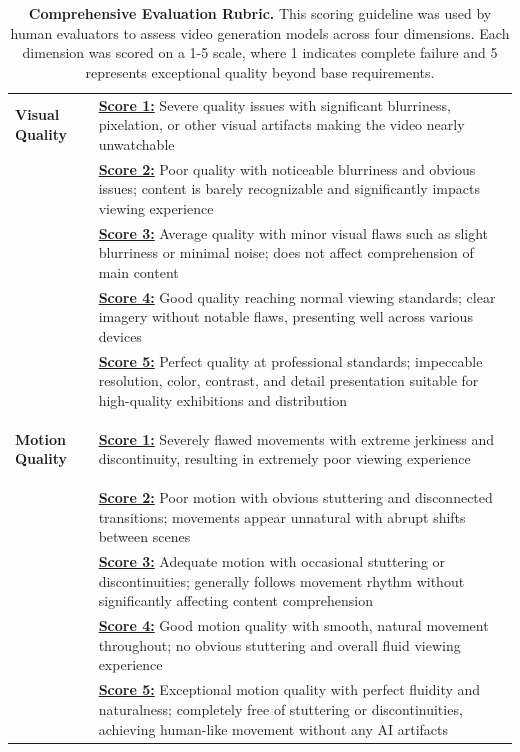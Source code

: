 \documentclass{article}
\begin{document}
\begin{table}[h]
\begin{tabular}{>{\raggedright\arraybackslash\bfseries}p{3cm}>{\raggedright\arraybackslash}p{12cm}}
\textbf{Visual Quality} & 
\textbf{\underline{Score 1:}} Severe quality issues with significant blurriness, pixelation, or other visual artifacts making the video nearly unwatchable\\[0.5ex]
& \textbf{\underline{Score 2:}} Poor quality with noticeable blurriness and obvious issues; content is barely recognizable and significantly impacts viewing experience\\[0.5ex]
& \textbf{\underline{Score 3:}} Average quality with minor visual flaws such as slight blurriness or minimal noise; does not affect comprehension of main content\\[0.5ex]
& \textbf{\underline{Score 4:}} Good quality reaching normal viewing standards; clear imagery without notable flaws, presenting well across various devices\\[0.5ex]
& \textbf{\underline{Score 5:}} Perfect quality at professional standards; impeccable resolution, color, contrast, and detail presentation suitable for high-quality exhibitions and distribution\\
\midrule

\textbf{Motion Quality} & 
\textbf{\underline{Score 1:}} Severely flawed movements with extreme jerkiness and discontinuity, resulting in extremely poor viewing experience\\[0.5ex]
& \textbf{\underline{Score 2:}} Poor motion with obvious stuttering and disconnected transitions; movements appear unnatural with abrupt shifts between scenes\\[0.5ex]
& \textbf{\underline{Score 3:}} Adequate motion with occasional stuttering or discontinuities; generally follows movement rhythm without significantly affecting content comprehension\\[0.5ex]
& \textbf{\underline{Score 4:}} Good motion quality with smooth, natural movement throughout; no obvious stuttering and overall fluid viewing experience\\[0.5ex]
& \textbf{\underline{Score 5:}} Exceptional motion quality with perfect fluidity and naturalness; completely free of stuttering or discontinuities, achieving human-like movement without any AI artifacts\\[1ex]
\bottomrule

\end{tabular}
\vspace{4pt}
\caption{\textbf{Comprehensive Evaluation Rubric.} This scoring guideline was used by human evaluators to assess video generation models across four dimensions. Each dimension was scored on a 1-5 scale, where 1 indicates complete failure and 5 represents exceptional quality beyond base requirements.}
\label{tab:evaluation_guidelines}
\end{table}
\end{document}
